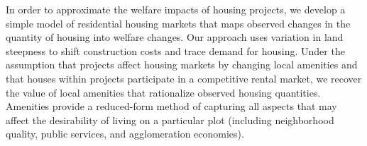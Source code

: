 \documentclass[12pt]{article}
\begin{document}


In order to approximate the welfare impacts of housing projects, we develop a simple model of residential housing markets that maps observed changes in the quantity of housing into welfare changes.  Our approach uses variation in land steepness to shift construction costs and trace demand for housing.  Under the assumption that projects affect housing markets by changing local amenities and that houses within projects participate in a competitive rental market, we recover the value of local amenities that rationalize observed housing quantities.  Amenities provide a reduced-form method of capturing all aspects that may affect the desirability of living on a particular plot (including neighborhood quality, public services, and agglomeration economies).





\end{document}
